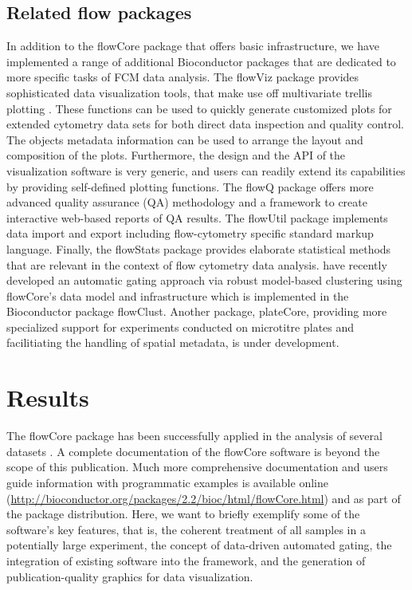 \documentclass[12pt]{article}
\newcommand{\Rpackage}[1]{{\textsf{#1}}}
\begin{document}
\subsection*{Related flow packages}

In addition to the \Rpackage{flowCore} package that offers basic
infrastructure, we have implemented a range of additional Bioconductor
packages that are dedicated to more specific tasks of FCM data
analysis. The \Rpackage{flowViz} package \citep{sarkar2008ufv}
provides sophisticated data visualization tools, that make use off
multivariate trellis plotting \citep{lattice}.  These functions can be
used to quickly generate customized plots for extended cytometry data
sets for both direct data inspection and quality control.  The objects
metadata information can be used to arrange the layout and composition
of the plots.  Furthermore, the design and the API of the
visualization software is very generic, and users can readily extend
its capabilities by providing self-defined plotting functions.  The
\Rpackage{flowQ} package offers more advanced quality assurance (QA)
methodology and a framework to create interactive web-based reports of
QA results. The \Rpackage{flowUtil} package implements data import and
export including flow-cytometry specific standard markup
language. Finally, the \Rpackage{flowStats} package provides elaborate
statistical methods that are relevant in the context of flow
cytometry data analysis. \cite{lo2008agf} have recently developed an
automatic gating approach via robust model-based clustering using
\Rpackage{flowCore}'s data model and infrastructure which is
implemented in the Bioconductor package \Rpackage{flowClust}. Another
package, \Rpackage{plateCore}, providing more specialized support for
experiments conducted on microtitre plates and facilitiating the
handling of spatial metadata, is under development.

\section*{Results}
The \Rpackage{flowCore} package has been successfully applied in the
analysis of several datasets
\citep{gasparetto2004ice,brinkman2007hcf}. A complete documentation of
the \Rpackage{flowCore} software is beyond the scope of this
publication.  Much more comprehensive documentation and users guide
information with programmatic examples is available online
(\url{http://bioconductor.org/packages/2.2/bioc/html/flowCore.html})
and as part of the package distribution. Here, we want to briefly
exemplify some of the software's key features, that is, the coherent
treatment of all samples in a potentially large experiment, the
concept of data-driven automated gating, the integration of existing
software into the framework, and the generation of publication-quality
graphics for data visualization.
\end{document}
